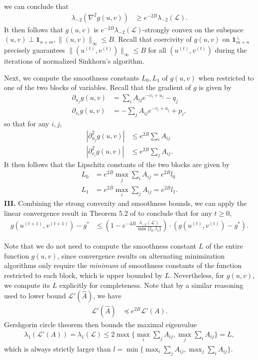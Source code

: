  we can conclude that 
\begin{align*}
\lambda_{-2}(\nabla^{2}g(u,v)) & \geq e^{-2B}\lambda_{-2}(\mathcal{L}).
\end{align*}
It then follows that $g(u,v)$ is $e^{-2B}\lambda_{-2}(\mathcal{L})$-strongly
convex on the subspace $(u,v)\perp\mathbf{1}_{n+m},\|(u,v)\|_{\infty}\leq B$. Recall that coercivity of $g(u,v)$ on $\mathbf{1}_{m+n}^\perp$ precisely guarantees $\|(u^{(t)},v^{(t)})\|_{\infty}\leq B$ for all $(u^{(t)},v^{(t)})$ during the iterations of normalized Sinkhorn's algorithm.

Next, we compute the smoothness constants $L_{0},L_{1}$ of $g(u,v)$
when restricted to one of the two blocks of variables. Recall that the gradient of $g$ is given by 
\begin{align*}
\partial_{u_{j}}g(u,v) & =\sum_{i}A_{ij}e^{-v_{i}+u_{j}}-q_{j}\\
\partial_{v_{i}}g(u,v) & =-\sum_{j}A_{ij}e^{-v_{i}+u_{j}}+p_{i},
\end{align*}
so that for any $i,j$,
\begin{align*}
|\partial_{u_{j}}^{2}g(u,v)| & \leq e^{2B}\sum_{i}A_{ij}\\
|\partial_{v_{i}}^{2}g(u,v)| & \leq e^{2B}\sum_{j}A_{ij}.
\end{align*}
 It then follows that the Lipschitz constants of the two blocks are
given by 
\begin{align*}
L_{0} & =e^{2B}\max_{j}\sum_{i}A_{ij}=e^{2B}l_{0}\\
L_{1} & =e^{2B}\max_{i}\sum_{j}A_{ij}=e^{2B}l_{1}.
\end{align*}
\textbf{III.} Combining the strong convexity and smoothness bounds, we can apply
the linear convergence result in Theorem 5.2 of \citet{beck2013convergence} to conclude that for any $t\geq 0$,
\begin{align*}
g(u^{(t+1)},v^{(t+1)})-g^{\ast} & \leq(1-e^{-4B}\frac{\lambda_{-2}(\mathcal{L})}{\min\{l_{0},l_{1}\}})\cdot\left(g(u^{(t)},v^{(t)})-g^{\ast}\right).
\end{align*}

Note that we do not need to compute the smoothness constant $L$ of
the entire function $g(u,v)$, since convergence results on alternating
minimization algorithms only require the \emph{minimum} of smoothness
constants of the function restricted to each block, which is upper
bounded by $L$. Nevertheless, for $g(u,v)$, we compute its $L$
explicitly for completeness. Note that by a similar reasoning used
to lower bound $\mathcal{L}'(\hat{A})$, we have
\begin{align*}
\mathcal{L}'(\hat{A}) & \preceq e^{2B}\mathcal{L}'(A).
\end{align*}
Gershgorin circle theorem then bounds the maximal eigenvalue
\begin{align*}
    \lambda_{1}(\mathcal{L}'(A))=\lambda_{1}(\mathcal{L})\leq2\max\{\max_{i}\sum_{j}A_{ij},\max_{j}\sum_{i}A_{ij}\}=L,
\end{align*}
which is always strictly larger than $l=\min\{\max_{i}\sum_{j}A_{ij},\max_{j}\sum_{i}A_{ij}\}$.

